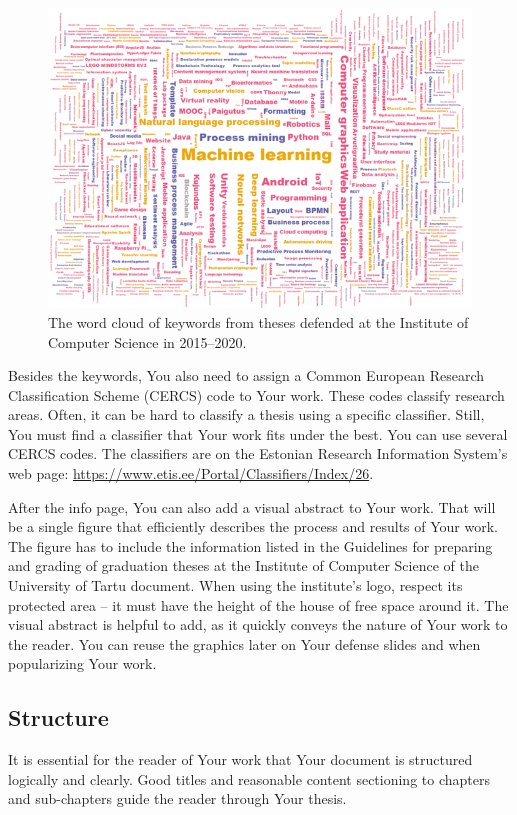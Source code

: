 \begin{figure}[ht]
    \centering
    \includegraphics[width=\textwidth]{figures/Figure1-Keywords.png}
    \caption{The word cloud of keywords from theses defended at the Institute of Computer Science in 2015–2020.}
    \label{fig:keywords}
\end{figure}

Besides the keywords, You also need to assign a Common European Research Classification Scheme (CERCS) code to Your work. These codes classify research areas. Often, it can be hard to classify a thesis using a specific classifier. Still, You must find a classifier that Your work fits under the best. You can use several CERCS codes. The classifiers are on the Estonian Research Information System’s web page: \url{https://www.etis.ee/Portal/Classifiers/Index/26}.

After the info page, You can also add a visual abstract to Your work. That will be a single figure that efficiently describes the process and results of Your work. The figure has to include the information listed in the Guidelines for preparing and grading of graduation theses at the Institute of Computer Science of the University of Tartu document. When using the institute’s logo, respect its protected area – it must have the height of the house of free space around it. The visual abstract is helpful to add, as it quickly conveys the nature of Your work to the reader. You can reuse the graphics later on Your defense slides and when popularizing Your work.

\subsection{Structure}
It is essential for the reader of Your work that Your document is structured logically and clearly. Good titles and reasonable content sectioning to chapters and sub-chapters guide the reader through Your thesis.

